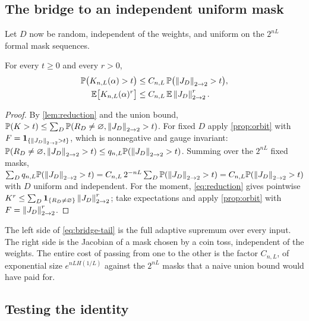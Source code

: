 \subsection{The bridge to an independent uniform mask}

Let $D$ now be random, independent of the weights, and uniform on the $2^{nL}$ formal mask sequences.

\begin{corollary}\label{cor:bridge}
For every $t\ge 0$ and every $r>0$,
\begin{align}
\mathbb{P}\bigl(K_{n,L}(\alpha)>t\bigr)&\le C_{n,L}\,\mathbb{P}\bigl(\left\lVert J_D\right\rVert_{2\to 2}>t\bigr),\label{eq:bridge-tail}\\
\mathbb{E}\bigl[K_{n,L}(\alpha)^r\bigr]&\le C_{n,L}\,\mathbb{E}\left\lVert J_D\right\rVert_{2\to 2}^r .\label{eq:bridge-moment}
\end{align}
\end{corollary}

\begin{proof}
By \cref{lem:reduction} and the union bound, $\mathbb{P}(K>t)\le\sum_D\mathbb{P}(R_D\ne\varnothing,\left\lVert J_D\right\rVert_{2\to 2}>t)$. For fixed $D$ apply \cref{prop:orbit} with $F=\mathbf{1}_{\{\left\lVert J_D\right\rVert_{2\to 2}>t\}}$, which is nonnegative and gauge invariant: $\mathbb{P}(R_D\ne\varnothing,\left\lVert J_D\right\rVert_{2\to 2}>t)\le q_{n,L}\mathbb{P}(\left\lVert J_D\right\rVert_{2\to 2}>t)$. Summing over the $2^{nL}$ fixed masks, $\sum_Dq_{n,L}\mathbb{P}(\left\lVert J_D\right\rVert_{2\to 2}>t)=C_{n,L}\,2^{-nL}\sum_D\mathbb{P}(\left\lVert J_D\right\rVert_{2\to 2}>t)=C_{n,L}\mathbb{P}(\left\lVert J_D\right\rVert_{2\to 2}>t)$ with $D$ uniform and independent. For the moment, \cref{eq:reduction} gives pointwise $K^r\le\sum_D\mathbf{1}_{\{R_D\ne\varnothing\}}\left\lVert J_D\right\rVert_{2\to 2}^r$; take expectations and apply \cref{prop:orbit} with $F=\left\lVert J_D\right\rVert_{2\to 2}^r$.
\end{proof}

The left side of \cref{eq:bridge-tail} is the full adaptive supremum over every input. The right side is the Jacobian of a mask chosen by a coin toss, independent of the weights. The entire cost of passing from one to the other is the factor $C_{n,L}$, of exponential size $e^{nLH(1/L)}$ against the $2^{nL}$ masks that a naive union bound would have paid for.

\subsection{Testing the identity}

